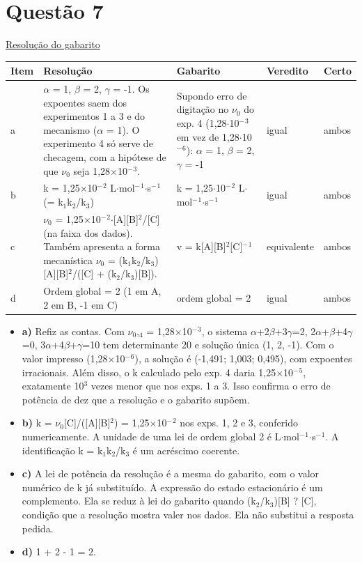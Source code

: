 \documentclass{article}%
\begin{document}
\section*{Questão 7}%
\href{https://poliedroresolve.sistemapoliedro.com.br/vestibulares/ime/2027/ime-2-fase-dia-3-28-10-2026-2-fase-dia-3/dissertativa-7-quimica-2-fase-dia-3-ime-2027}{Resolução do gabarito}\par\smallskip%
\begin{longtable}{@{}p{} p{} p{} p{} p{}@{}}\toprule Item & Resolução & Gabarito & Veredito & Certo \\ \midrule
a & $\alpha$ = 1, $\beta$ = 2, $\gamma$ = -1. Os expoentes saem dos experimentos 1 a 3 e do mecanismo ($\alpha$ = 1). O experimento 4 só serve de checagem, com a hipótese de que $\nu$$_{0}$ seja 1,28$\times$10$^{-}$$^3$. & Supondo erro de digitação no $\nu$$_{0}$ do exp. 4 (1,28$\cdot$10$^{-}$$^3$ em vez de 1,28$\cdot$10$^{-}$$^{6}$): $\alpha$ = 1, $\beta$ = 2, $\gamma$ = -1 & igual & ambos \\
b & k = 1,25$\times$10$^{-}$$^2$ L$\cdot$mol$^{-}$$^{1}$$\cdot$s$^{-}$$^{1}$ (= k$_{1}$k$_{2}$/k$_{3}$) & k = 1,25$\cdot$10$^{-}$$^2$ L$\cdot$mol$^{-}$$^{1}$$\cdot$s$^{-}$$^{1}$ & igual & ambos \\
c & $\nu$$_{0}$ = 1,25$\times$10$^{-}$$^2$$\cdot${[}A{]}{[}B{]}$^2$/{[}C{]} (na faixa dos dados). Também apresenta a forma mecanística $\nu$$_{0}$ = (k$_{1}$k$_{2}$/k$_{3}$){[}A{]}{[}B{]}$^2$/({[}C{]} + (k$_{2}$/k$_{3}$){[}B{]}). & v = k{[}A{]}{[}B{]}$^2${[}C{]}$^{-}$$^{1}$ & equivalente & ambos \\
d & Ordem global = 2 (1 em A, 2 em B, -1 em C) & ordem global = 2 & igual & ambos \\
\bottomrule\end{longtable}%
\begin{itemize}%
\item%
\textbf{a)} Refiz as contas. Com $\nu$$_{0}$,$_{4}$ = 1,28$\times$10$^{-}$$^3$, o sistema $\alpha$+2$\beta$+3$\gamma$=2, 2$\alpha$+$\beta$+4$\gamma$=0, 3$\alpha$+4$\beta$+$\gamma$=10 tem determinante 20 e solução única (1, 2, -1). Com o valor impresso (1,28$\times$10$^{-}$$^{6}$), a solução é (-1,491; 1,003; 0,495), com expoentes irracionais. Além disso, o k calculado pelo exp. 4 daria 1,25$\times$10$^{-}$$^{5}$, exatamente 10$^3$ vezes menor que nos exps. 1 a 3. Isso confirma o erro de potência de dez que a resolução e o gabarito supõem.%
\item%
\textbf{b)} k = $\nu$$_{0}${[}C{]}/({[}A{]}{[}B{]}$^2$) = 1,25$\times$10$^{-}$$^2$ nos exps. 1, 2 e 3, conferido numericamente. A unidade de uma lei de ordem global 2 é L$\cdot$mol$^{-}$$^{1}$$\cdot$s$^{-}$$^{1}$. A identificação k = k$_{1}$k$_{2}$/k$_{3}$ é um acréscimo coerente.%
\item%
\textbf{c)} A lei de potência da resolução é a mesma do gabarito, com o valor numérico de k já substituído. A expressão do estado estacionário é um complemento. Ela se reduz à lei do gabarito quando (k$_{2}$/k$_{3}$){[}B{]} ? {[}C{]}, condição que a resolução mostra valer nos dados. Ela não substitui a resposta pedida.%
\item%
\textbf{d)} 1 + 2 - 1 = 2.%
\end{itemize}%
\end{document}
